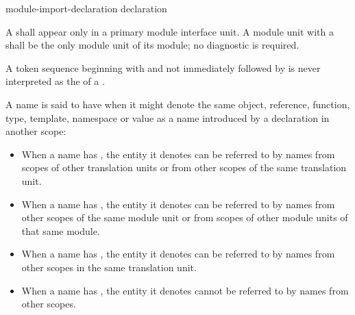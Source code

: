 \begin{bnf}
\br
    module-import-declaration\br
    declaration
\end{bnf}

\pnum
A  shall appear only
in a primary module interface unit.
A module unit with a 
shall be the only module unit of its module;
no diagnostic is required.

\pnum
A token sequence beginning with
 
and not immediately followed by \tcode{::}
is never interpreted as the 
of a .

\pnum
{}%
%
%
%
A name is said to have  when it might denote the same
object, reference, function, type, template, namespace or value as a
name introduced by a declaration in another scope:
\begin{itemize}
\item When a name has ,
the entity it denotes
can be referred to by names from scopes of other translation units or
from other scopes of the same translation unit.

\item When a name has ,
the entity it denotes
can be referred to by names from other scopes of the same module unit or
from scopes of other module units of that same module.

\item When a name has ,
the entity it denotes
can be referred to by names from other scopes in the same translation
unit.

\item When a name has , the entity it denotes
cannot be referred to by names from other scopes.
\end{itemize}

